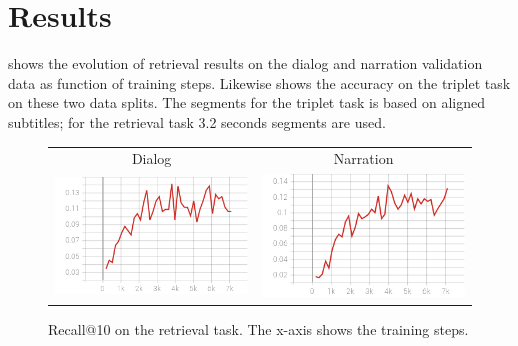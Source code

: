 \section{Results}
\label{sec:results}
 shows the evolution of retrieval results on the
{\sc dialog} and {\sc narration} validation data as function of
training steps.  Likewise  shows the accuracy on the
triplet task on these two data splits. The segments for the triplet
task is based on aligned subtitles; for the retrieval task 3.2 seconds
segments are used.

\begin{figure}
  \centering
  \begin{tabular}{cc}
    Dialog & Narration \\
    \includegraphics[scale=0.3]{val_rec10.png} & \includegraphics[scale=0.3]{valnarr_rec10.png}\\
  \end{tabular}
  \caption{Recall@10 on the retrieval task. The x-axis shows the training
    steps.}
  \label{fig:retrieval}
\end{figure}

